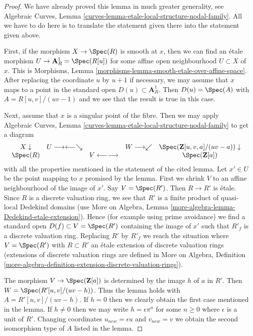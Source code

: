 \begin{proof}
We have already proved this lemma in much greater generality, see
Algebraic Curves, Lemma \ref{curves-lemma-etale-local-structure-nodal-family}.
All we have to do here is to translate the statement
given there into the statement given above.

\medskip\noindent
First, if the morphism $X \to \Spec(R)$ is smooth at $x$,
then we can find an \'etale morphism $U \to \mathbf{A}^1_R = \Spec(R[u])$ for
some affine open neighbourhood $U \subset X$ of $x$. This is
Morphisms, Lemma \ref{morphisms-lemma-smooth-etale-over-affine-space}.
After replacing the coordinate $u$ by $u + 1$ if necessary, we may
assume that $x$ maps to a point in the standard open
$D(u) \subset \mathbf{A}^1_R$. Then $D(u) = \Spec(A)$ with
$A = R[u, v]/(uv - 1)$ and we see that the result is true in this case.

\medskip\noindent
Next, assume that $x$ is a singular point of the fibre. Then we may apply
Algebraic Curves, Lemma \ref{curves-lemma-etale-local-structure-nodal-family}
to get a diagram
$$
\begin{array}{ccccc}X \downarrow & U \longrightarrow\longleftarrow\searrow &  & W \longrightarrow\swarrow & \Spec(\mathbf{Z}[u, v, a]/(uv - a)) \downarrow \\ \Spec(R) &  & V \longleftarrow\longrightarrow &  & \Spec(\mathbf{Z}[a])\end{array}
$$
with all the properties mentioned in the statement of the cited lemma.
Let $x' \in U$ be the point mapping to $x$ promised by the lemma.
First we shrink $V$ to an affine neighbourhood of the image of $x'$.
Say $V = \Spec(R')$. Then $R \to R'$ is \'etale. Since $R$ is a
discrete valuation ring, we see that $R'$ is a finite
product of quasi-local Dedekind domains (use
More on Algebra, Lemma \ref{more-algebra-lemma-Dedekind-etale-extension}).
Hence (for example using prime avoidance) we find a standard
open $D(f) \subset V = \Spec(R')$ containing the image of $x'$
such that $R'_f$ is a discrete valuation ring.
Replacing $R'$ by $R'_f$ we reach the situation where
$V = \Spec(R')$ with $R \subset R'$ an \'etale extension of
discrete valuation rings (extensions of discrete valuation rings
are defined in More on Algebra, Definition
\ref{more-algebra-definition-extension-discrete-valuation-rings}).

\medskip\noindent
The morphism $V \to \Spec(\mathbf{Z}[a])$ is determined by
the image $h$ of $a$ in $R'$. Then $W = \Spec(R'[u, v]/(uv - h))$.
Thus the lemma holds with
$A = R'[u, v]/(uv - h)$. If $h = 0$ then we clearly
obtain the first case mentioned in the lemma. If $h \not = 0$
then we may write $h = \epsilon \pi^n$ for some $n \geq 0$
where $\epsilon$ is a unit of $R'$. Changing coordinates
$u_{new} = \epsilon u$ and $v_{new} = v$ we obtain the second
isomorphism type of $A$ listed in the lemma.
\end{proof}

